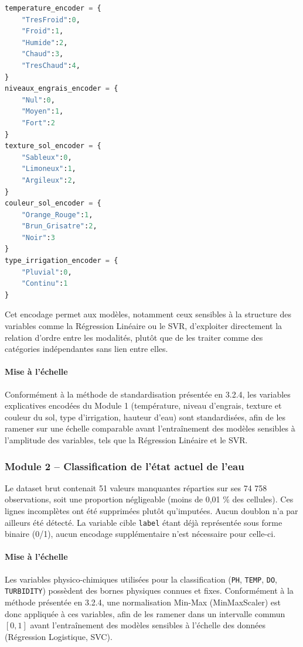 \documentclass[a4paper,12pt, oneside]{article}
\begin{document}
\begin{lstlisting}[language=Python]
temperature_encoder = {
    "TresFroid":0,
    "Froid":1,
    "Humide":2,
    "Chaud":3,
    "TresChaud":4,
}
niveaux_engrais_encoder = {
    "Nul":0,
    "Moyen":1,
    "Fort":2
}
texture_sol_encoder = {
    "Sableux":0,
    "Limoneux":1,
    "Argileux":2,
}
couleur_sol_encoder = {
    "Orange_Rouge":1,
    "Brun_Grisatre":2,
    "Noir":3
}
type_irrigation_encoder = {
    "Pluvial":0,
    "Continu":1
}
\end{lstlisting}

Cet encodage permet aux modèles, notamment ceux sensibles à la structure des variables comme la Régression Linéaire ou le SVR, d'exploiter directement la relation d'ordre entre les modalités, plutôt que de les traiter comme des catégories indépendantes sans lien entre elles.

\paragraph{Mise à l'échelle\\}
Conformément à la méthode de standardisation présentée en 3.2.4, les variables explicatives encodées du Module 1 (température, niveau d'engrais, texture et couleur du sol, type d'irrigation, hauteur d'eau) sont standardisées, afin de les ramener sur une échelle comparable avant l'entraînement des modèles sensibles à l'amplitude des variables, tels que la Régression Linéaire et le SVR.

\subsubsection[Classification de l'état actuel de l'eau]{Module 2 -- Classification de l'état actuel de l'eau\\}
Le dataset brut contenait 51 valeurs manquantes réparties sur ses 74 758 observations, soit une proportion négligeable (moins de 0,01 \% des cellules). Ces lignes incomplètes ont été supprimées plutôt qu'imputées. Aucun doublon n'a par ailleurs été détecté. La variable cible \texttt{label} étant déjà représentée sous forme binaire (0/1), aucun encodage supplémentaire n'est nécessaire pour celle-ci.

\paragraph{Mise à l'échelle\\}
Les variables physico-chimiques utilisées pour la classification (\texttt{PH}, \texttt{TEMP}, \texttt{DO}, \texttt{TURBIDITY}) possèdent des bornes physiques connues et fixes. Conformément à la méthode présentée en 3.2.4, une normalisation Min-Max (MinMaxScaler) est donc appliquée à ces variables, afin de les ramener dans un intervalle commun $[0,1]$ avant l'entraînement des modèles sensibles à l'échelle des données (Régression Logistique, SVC).
\end{document}
